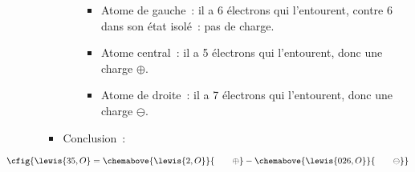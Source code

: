 \documentclass[a4paper, 12pt, final, garamond]{book}
\begin{document}
\begin{enumerate}[start=2]
\begin{itemize}[label=$\diamond$, leftmargin=10pt]
\begin{itemize}[label=$\triangleright$, leftmargin=20pt]
\begin{itemize}[label=$\ra$, leftmargin=20pt]
                            \begin{itemize}[label=$\bullet$, leftmargin=20pt]
                                \item Atome de gauche~: il a 6 électrons qui
                                    l'entourent, contre 6 dans son état isolé~:
                                    pas de charge.
                                \item Atome central~: il a 5 électrons qui
                                    l'entourent, donc une charge $\oplus$.
                                \item Atome de droite~: il a 7 électrons qui
                                    l'entourent, donc une charge $\ominus$.
                            \end{itemize}
                        \end{itemize}
                    \item Conclusion~:
                \end{itemize}
        \end{itemize}
\end{enumerate}
\[
    \cfig{\lewis{35,O}=
        \chemabove{\lewis{2,O}}{\vspace{10pt}\hspace{20pt}\oplus}
        -\chemabove{\lewis{026,O}}{\vspace{-12pt}\hspace{20pt}\ominus}
    }
\]
\end{document}
